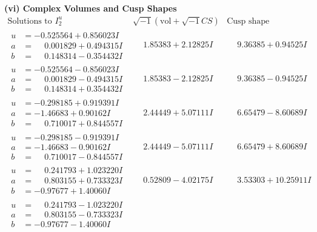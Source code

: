 \documentclass[1p]{elsarticle_modified}
\theoremstyle{definition}
\newcommand{\I}{\sqrt{-1}}
\begin{document}
\newpage\flushleft \textbf{(vi) Complex Volumes and Cusp Shapes}
$$\begin{array}{c|c|c}  
\text{Solutions to }I^u_{2}& \I (\text{vol} + \sqrt{-1}CS) & \text{Cusp shape}\\
 \hline 
\begin{aligned}
u &= -0.525564 + 0.856023 I \\
a &= \phantom{-}0.001829 + 0.494315 I \\
b &= \phantom{-}0.148314 - 0.354432 I\end{aligned}
 & \phantom{-}1.85383 + 2.12825 I & \phantom{-}9.36385 + 0.94525 I \\ \hline\begin{aligned}
u &= -0.525564 - 0.856023 I \\
a &= \phantom{-}0.001829 - 0.494315 I \\
b &= \phantom{-}0.148314 + 0.354432 I\end{aligned}
 & \phantom{-}1.85383 - 2.12825 I & \phantom{-}9.36385 - 0.94525 I \\ \hline\begin{aligned}
u &= -0.298185 + 0.919391 I \\
a &= -1.46683 + 0.90162 I \\
b &= \phantom{-}0.710017 + 0.844557 I\end{aligned}
 & \phantom{-}2.44449 + 5.07111 I & \phantom{-}6.65479 - 8.60689 I \\ \hline\begin{aligned}
u &= -0.298185 - 0.919391 I \\
a &= -1.46683 - 0.90162 I \\
b &= \phantom{-}0.710017 - 0.844557 I\end{aligned}
 & \phantom{-}2.44449 - 5.07111 I & \phantom{-}6.65479 + 8.60689 I \\ \hline\begin{aligned}
u &= \phantom{-}0.241793 + 1.023220 I \\
a &= \phantom{-}0.803155 + 0.733323 I \\
b &= -0.97677 + 1.40060 I\end{aligned}
 & \phantom{-}0.52809 - 4.02175 I & \phantom{-}3.53303 + 10.25911 I \\ \hline\begin{aligned}
u &= \phantom{-}0.241793 - 1.023220 I \\
a &= \phantom{-}0.803155 - 0.733323 I \\
b &= -0.97677 - 1.40060 I\end{aligned}

\end{array}$$
\end{document}
